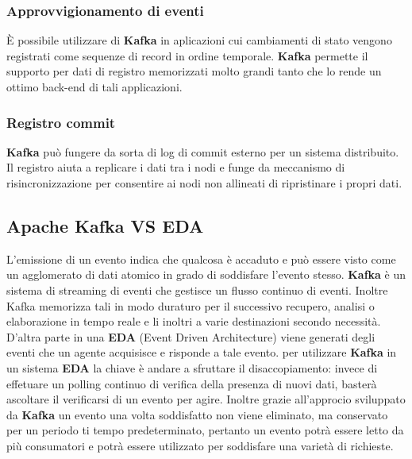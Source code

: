 \documentclass{article}
\begin{document}
\subsubsection{Approvvigionamento di eventi}
È possibile utilizzare  di \textbf{Kafka} in aplicazioni cui cambiamenti di stato vengono registrati come sequenze di record in ordine temporale. \textbf{Kafka} permette il supporto per dati di registro memorizzati molto grandi tanto che lo rende un ottimo back-end di tali applicazioni. 
\subsubsection{Registro commit}
\textbf{Kafka} può fungere da sorta di log di commit esterno per un sistema distribuito. Il registro aiuta a replicare i dati tra i nodi e funge da meccanismo di risincronizzazione per consentire ai nodi non allineati di ripristinare i propri dati.

\subsection{Apache Kafka VS EDA}
L'emissione di un evento indica che qualcosa è accaduto e può essere visto come un agglomerato di dati atomico in grado di soddisfare l'evento stesso. 
\textbf{Kafka} è un sistema di streaming di eventi che gestisce un flusso continuo di eventi. Inoltre Kafka memorizza tali in modo duraturo per il successivo recupero, analisi o elaborazione in tempo reale e li inoltri a varie destinazioni secondo necessità.
\\
D'altra parte in una \textbf{EDA} (Event Driven Architecture) viene generati degli eventi che un agente acquisisce e risponde a tale evento.
per utilizzare \textbf{Kafka} in un sistema \textbf{EDA} la chiave è andare a sfruttare il disaccopiamento: invece di effetuare un polling continuo di verifica della presenza di nuovi dati, basterà ascoltare il verificarsi di un evento per agire. Inoltre grazie all'approcio sviluppato da \textbf{Kafka} un evento una volta soddisfatto non viene eliminato, ma conservato per un periodo ti tempo predeterminato, pertanto un evento potrà essere letto da più consumatori e potrà essere utilizzato per soddisfare una varietà di richieste.





\end{document}

